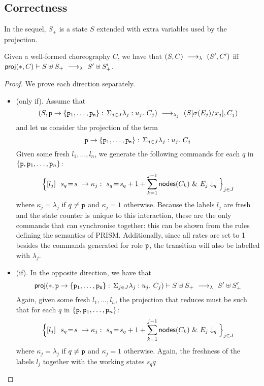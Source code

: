 



\subsection{Correctness}

In the sequel, $S_+$ is a state $S$ extended with extra variables used
by the projection.
\begin{theorem}[EPP]\label{thm:epp}
  Given a well-formed choreography $C$, we have that
  $(S,C) \ \longrightarrow_{\lambda}\  (S', C')$ iff
  $\mathsf{proj} (*, C)\vdash S\uplus S_{+}\ \longrightarrow_{\lambda}\  S'\uplus S_{+}'$.
\end{theorem} 
\begin{proof} We prove each direction separately.
  \begin{itemize}
  \item (only if). Assume that
    $$(S, \mathtt{p}\rightarrow \{\mathtt{\mathtt{p}_1,\ldots,\mathtt{p}_n}\}:\,\Sigma_{j\in J}\lambda_j: u_j.\ C_j)\ \longrightarrow_{\lambda_j}\ (S[\sigma(E_j)/x_j], C_j)$$
    and let us consider the projection of the term
    $$\mathtt{p}\rightarrow \{\mathtt{\mathtt{p}_1,\ldots,\mathtt{p}_n}\}:\,\Sigma_{j\in J}\lambda_j: u_j.\ C_j$$
    Given some fresh $l_1,\ldots, l_n$, we generate the following
    commands for each $q$ in
    $\{\mathtt{p}, \mathtt{p}_1,\ldots,\mathtt{p}_n\}$:
    $$
    \Big\{\commandBase {l_j} {\ s_{q}\!=\! s} {\kappa_j:\ s_{q}\!=\!
      s_{q} +1+\sum_{k=1}^{j-1}\mathsf{nodes}({C_k})}\ \&\ \projE
    {E_j}q\Big\}_{j\in J}
    $$
    where $\kappa_j=\lambda_j$ if $q\neq\mathtt{p}$ and $\kappa_j=1$
    otherwise. 
    Because the labels $l_j$ are fresh and the state counter is unique
    to this interaction, these are the only commands that can
    synchronise together: this can be shown from the rules defining
    the semantics of PRISM. Additionally, since all rates are set to 1
    besides the commands generated for role $\mathtt{p}$, the transition
    will also be labelled with $\lambda_j$.


  \item (if). In the opposite direction, we have that 
    $$\mathsf{proj} (*, \mathtt{p}\rightarrow \{\mathtt{\mathtt{p}_1,\ldots,\mathtt{p}_n}\}:\,\Sigma_{j\in J}\lambda_j: u_j.\ C_j)\vdash
    S\uplus S_{+}\ \longrightarrow_{\lambda}\  S'\uplus S_{+}'$$
    Again, given some fresh $l_1,\ldots, l_n$, the projection that
    reduces must be such that for each $q$ in
    $\{\mathtt{p}, \mathtt{p}_1,\ldots,\mathtt{p}_n\}$:
    $$
    \Big\{\commandBase {l_j} {\ s_{q}\!=\! s} {\kappa_j:\ s_{q}\!=\!
      s_{q} +1+\sum_{k=1}^{j-1}\mathsf{nodes}({C_k})}\ \&\ \projE
    {E_j}q\Big\}_{j\in J}
    $$
    where $\kappa_j=\lambda_j$ if $q\neq\mathtt{p}$ and $\kappa_j=1$
    otherwise. 
    Again, the freshness of the labels $l_j$ together with the working
    states $s_qq$


\end{itemize}
\end{proof}
